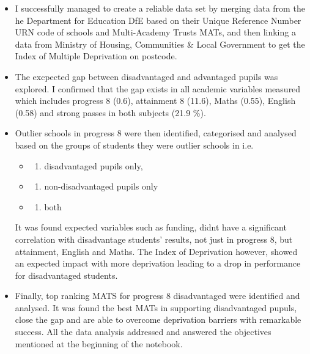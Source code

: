 \documentclass[
  letterpaper,
  DIV=11,
  numbers=noendperiod]{scrartcl}
\providecommand{\tightlist}{%
  \setlength{\itemsep}{0pt}\setlength{\parskip}{0pt}}\usepackage{longtable,booktabs,array}
\begin{document}
\begin{itemize}
\item
  I successfully managed to create a reliable data set by merging data
  from the he Department for Education DfE based on their Unique
  Reference Number URN code of schools and Multi-Academy Trusts MATs,
  and then linking a data from Ministry of Housing, Communities \& Local
  Government to get the Index of Multiple Deprivation on postcode.
\item
  The excpected gap between disadvantaged and advantaged pupils was
  explored. I confirmed that the gap exists in all academic variables
  measured which includes progress 8 (0.6), attainment 8 (11.6), Maths
  (0.55), English (0.58) and strong passes in both subjects (21.9 \%).
\item
  Outlier schools in progress 8 were then identified, categorised and
  analysed based on the groups of students they were outlier schools in
  i.e.~

  \begin{itemize}
  \tightlist
  \item
    \begin{enumerate}
    \def\labelenumi{\alph{enumi})}
    \tightlist
    \item
      disadvantaged pupils only,
    \end{enumerate}
  \item
    \begin{enumerate}
    \def\labelenumi{\alph{enumi})}
    \setcounter{enumi}{1}
    \tightlist
    \item
      non-disadvantaged pupils only
    \end{enumerate}
  \item
    \begin{enumerate}
    \def\labelenumi{\alph{enumi})}
    \setcounter{enumi}{2}
    \tightlist
    \item
      both
    \end{enumerate}
  \end{itemize}

  It was found expected variables such as funding, didnt have a
  significant correlation with disadvantage students' results, not just
  in progress 8, but attainment, English and Maths. The Index of
  Deprivation however, showed an expected impact with more deprivation
  leading to a drop in performance for disadvantaged students.
\item
  Finally, top ranking MATS for progress 8 disadvantaged were identified
  and analysed. It was found the best MATs in supporting disadvantaged
  pupuls, close the gap and are able to overcome deprivation barriers
  with remarkable success. All the data analysis addressed and answered
  the objectives mentioned at the beginning of the notebook.
\end{itemize}
\end{document}
